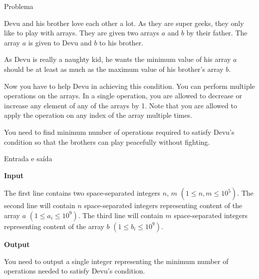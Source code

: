 
\begin{frame}[fragile]{Problema}

Devu and his brother love each other a lot. As they are super geeks, they only like to play with 
arrays. They are given two arrays $a$ and $b$ by their father. The array $a$ is given to Devu and 
$b$ to his brother.

As Devu is really a naughty kid, he wants the minimum value of his array $a$ should be at least as 
much as the maximum value of his brother's array $b$.

Now you have to help Devu in achieving this condition. You can perform multiple operations on the 
arrays. In a single operation, you are allowed to decrease or increase any element of any of the 
arrays by 1. Note that you are allowed to apply the operation on any index of the array multiple 
times.

You need to find minimum number of operations required to satisfy Devu's condition so that the 
brothers can play peacefully without fighting.

\end{frame}

\begin{frame}[fragile]{Entrada e saída}

\textbf{Input}

The first line contains two space-separated integers $n$, $m$ $(1\leq n, m\leq 10^5)$. The second 
line will contain $n$ space-separated integers representing content of the array $a$ 
$(1\leq a_i\leq 10^9)$. The third line will contain $m$ space-separated integers representing 
content of the array $b$ $(1\leq b_i\leq 10^9)$.

\vspace{0.2in}

\textbf{Output}

You need to output a single integer representing the minimum number of operations needed to satisfy Devu's condition.

\end{frame}


